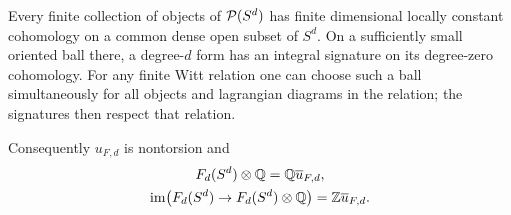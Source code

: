 \begin{proposition}
\label{prop:generic-signature}
Every finite collection of objects of $\mathcal P(S^d)$ has finite
dimensional locally constant cohomology on a common dense open
subset of $S^d$.  On a sufficiently small oriented ball there, a
degree-$d$ form has an integral signature on its degree-zero
cohomology.  For any finite
Witt relation one can choose such a ball simultaneously for all
objects and lagrangian diagrams in the relation; the signatures
then respect that relation.

Consequently $u_{F,d}$ is nontorsion and
\[
 \begin{gathered}
 F_d(S^d)\otimes\mathbb Q=\mathbb Q\overline{u}_{F,d},\\
 \operatorname{im}\bigl(F_d(S^d)\to F_d(S^d)\otimes\mathbb Q\bigr)=\mathbb Z\overline{u}_{F,d}.
 \end{gathered}
\]
\end{proposition}

